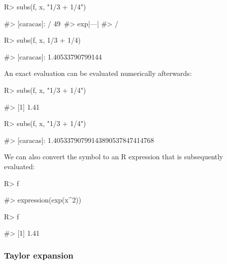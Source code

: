 \begin{Schunk}
\begin{Sinput}
R> subs(f, x, "1/3 + 1/4")
\end{Sinput}
\begin{Soutput}
#> [caracas]:    / 49\
#>            exp|---|
#>               /
\end{Soutput}
\begin{Sinput}
R> subs(f, x, 1/3 + 1/4)
\end{Sinput}
\begin{Soutput}
#> [caracas]: 1.40533790799144
\end{Soutput}
\end{Schunk}

An exact evaluation can be evaluated numerically afterwards:

\begin{Schunk}
\begin{Sinput}
R> subs(f, x, "1/3 + 1/4") %
\end{Sinput}
\begin{Soutput}
#> [1] 1.41
\end{Soutput}
\begin{Sinput}
R> subs(f, x, "1/3 + 1/4") %
\end{Sinput}
\begin{Soutput}
#> [caracas]: 1.40533790799143890537847414768
\end{Soutput}
\end{Schunk}

We can also convert the \CRANpkg{caracas} symbol to an R expression that
is subsequently evaluated:

\begin{Schunk}
\begin{Sinput}
R> f %
\end{Sinput}
\begin{Soutput}
#> expression(exp(x^2))
\end{Soutput}
\begin{Sinput}
R> f %
\end{Sinput}
\begin{Soutput}
#> [1] 1.41
\end{Soutput}
\end{Schunk}

\hypertarget{taylor-expansion}{%
\subsubsection{Taylor expansion}\label{taylor-expansion}}

